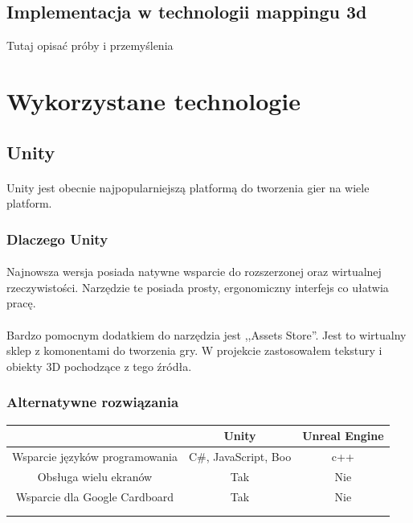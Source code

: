 \documentclass[12pt]{article}
\begin{document}
{{\subsection{Implementacja w technologii mappingu 3d}
{\color{red}Tutaj opisać próby i przemyślenia}

\section{Wykorzystane technologie}

\subsection{Unity}
\paragraph{}
Unity jest obecnie najpopularniejszą platformą do tworzenia gier na wiele platform. 
\subsubsection{Dlaczego Unity}
\paragraph{}
Najnowsza wersja posiada natywne wsparcie do rozszerzonej oraz wirtualnej rzeczywistości. Narzędzie te posiada prosty, ergonomiczny interfejs co ułatwia pracę.
\paragraph{}
Bardzo pomocnym dodatkiem do narzędzia jest ,,Assets Store''. Jest to wirtualny sklep z komonentami do tworzenia gry. W projekcie zastosowałem tekstury i obiekty 3D pochodzące z tego źródła.
\subsubsection{Alternatywne rozwiązania}
 \begin{tabular}{|c|c|c|}
 \hline
 \ & Unity & Unreal Engine \\ 
  \hline
 Wsparcie języków programowania & C\#, JavaScript, Boo & c++ \\  
  \hline
 Obsługa wielu ekranów & Tak & Nie \\
 \hline  
  Wsparcie dla Google Cardboard & Tak & Nie \\
  \hline   
  &  &  \\
  \hline   
  &  &  \\
  \hline   
\end{tabular}

}}
\end{document}
